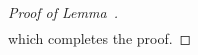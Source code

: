 \documentclass{article}
\newcommand{\R}{\mathbb{R}}
\theoremstyle{plain}
\theoremstyle{definition}
\theoremstyle{remark}
\renewcommand{\d}{\mathrm{d}}
\newcommand{\grad}[1]{\nabla_{\! #1}}
\newcommand{\ddgamma}{\tfrac{\d}{\d\gamma}}
\newcommand{\g}{g_\gamma}
\begin{document}
\begin{proof}[Proof of Lemma~]
\begin{align*}
    \end{align*}
    which completes the proof.
\end{proof}
\end{document}
